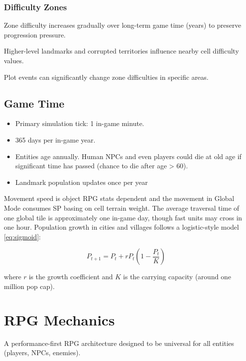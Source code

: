 \documentclass[a4paper,12pt]{article}
\begin{document}
\subsubsection{Difficulty Zones}

Zone difficulty increases gradually over long-term game time (years) to preserve progression pressure.

Higher-level landmarks and corrupted territories influence nearby cell difficulty values.

Plot events can significantly change zone difficulties in specific areas.

\subsection{Game Time}

\begin{itemize}
\item Primary simulation tick: 1 in-game minute.
\item 365 days per in-game year.
\item Entities age annually. Human NPCs and even players could die at old age if significant time has passed (chance to die after age > 60).
\item Landmark population updates once per year
\end{itemize}

Movement speed is object RPG stats dependent and the movement in Global Mode consumes SP basing on cell terrain weight.
The average traversal time of one global tile is approximately one in-game day, though fast units may cross in one hour.
Population growth in cities and villages follows a logistic-style model \autoref{eq:sigmoid}:

\begin{equation}
P_{t+1} = P_t + rP_t \left(1 - \frac{P_t}{K} \right)
 \label{eq:sigmoid}
\end{equation}

where $r$ is the growth coefficient and $K$ is the carrying capacity (around one million pop cap).

\newpage

\section{RPG Mechanics}
\label{sec:RPG}

A performance-first RPG architecture designed to be universal for all entities (players, NPCs, enemies).
\end{document}
